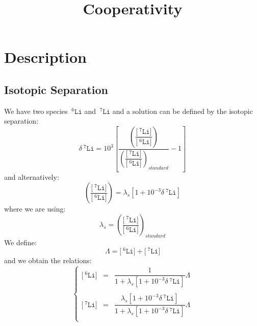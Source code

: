 \documentclass[aps,onecolumn,11pt]{revtex4}
\newcommand{\mychem}[1]{\mathtt{#1}}
\newcommand{\myconc}[1]{\big[#1\big]}
\newcommand{\spLi}[1]{{\!~^{#1}\mychem{Li}}}
\newcommand{\Li}[1]{\myconc{\spLi{#1}}}
\newcommand{\deltaLi}{\delta\!\!\spLi{7}}
\newcommand{\LiAll}{\Lambda}
\begin{document}
\title{Cooperativity}
\maketitle

\section{Description}
\subsection{Isotopic Separation}
We have two species $\spLi{6}$ and $\spLi{7}$ and a solution can be defined by the isotopic 
separation:
\begin{equation}
	\deltaLi = 10^3 \left[ 
	\dfrac{
	\left(\dfrac{\Li{7}}{\Li{6}}\right)
	}
	{
	\left(\dfrac{\Li{7}}{\Li{6}}\right)_{standard}
	}
	- 1 \right]
\end{equation}
and alternatively:
\begin{equation}
	\left(\dfrac{\Li{7}}{\Li{6}}\right) = \lambda_s \left[ 1+10^{-3} \deltaLi \right]
\end{equation}
where we are using:
\begin{equation}
	\lambda_s = \left(\dfrac{\Li{7}}{\Li{6}}\right)_{standard} %
\end{equation}
We define:
\begin{equation}
	\LiAll = \Li{6}+\Li{7}
\end{equation}
and we obtain the relations:
\begin{equation}
\left\lbrace
\begin{array}{rcl}
\Li{6} & = & \dfrac{1}{1+\lambda_s[1+10^{-3}\deltaLi]} \LiAll \\
\\
\Li{7} & = &  \dfrac{\lambda_s[1+10^{-3}\deltaLi]}{1+\lambda_s[1+10^{-3}\deltaLi]}\LiAll\\
\end{array}
\right.
\end{equation}
\end{document}
